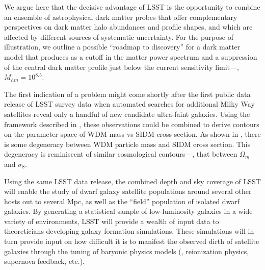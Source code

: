 We argue here that the decisive advantage of LSST is the opportunity to combine an ensemble of astrophysical dark matter probes that offer complementary perspectives on dark matter halo abundances and profile shapes, and which are affected by different sources of systematic uncertainty.
For the purpose of illustration, we outline a possible ``roadmap to discovery'' for a dark matter model that produces as a cutoff in the matter power spectrum and a suppression of the central dark matter profile just below the current sensitivity limit---\ie, $M_{hm} = 10^{8.5}$.

The first indication of a problem might come shortly after the first public data release of LSST survey data when automated searches for additional Milky Way satellites reveal only a handful of new candidate ultra-faint galaxies. 
Using the framework described in , these observations could be combined to derive contours on the parameter space of WDM mass vs SIDM cross-section.
As shown in , there is some degeneracy between WDM particle mass and SIDM cross section.
This degeneracy is reminiscent of similar cosmological contours---\eg, that between $\Omega_m$ and $\sigma_8$.

Using the same LSST data release, the combined depth and sky coverage of LSST will enable the study of dwarf galaxy satellite populations around several other hosts out to several Mpc, as well as the ``field'' population of isolated dwarf galaxies.
By generating a statistical sample of low-luminosity galaxies in a wide variety of environments, LSST will provide a wealth of input data to theoreticians developing galaxy formation simulations.
These simulations will in turn provide input on how difficult it is to manifest the observed dirth of satellite galaxies through the tuning of baryonic physics models (\eg, reionization physics, supernova feedback, etc.).

